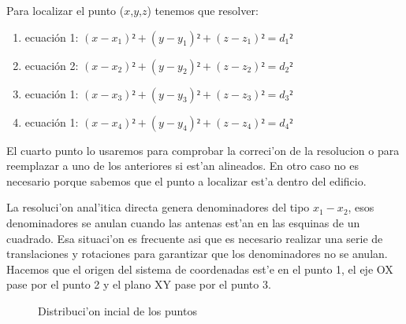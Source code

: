 Para localizar el punto ($x$,$y$,$z$) tenemos que resolver:
\begin{enumerate}
	\item ecuación 1: $(x - x_1)² + (y - y_1)² +(z - z_1)² = d_1² $
	\item ecuación 2: $(x - x_2)² + (y - y_2)² +(z - z_2)² = d_2² $
	\item ecuación 1: $(x - x_3)² + (y - y_3)² +(z - z_3)² = d_3² $
	\item ecuación 1: $(x - x_4)² + (y - y_4)² +(z - z_4)² = d_4² $
\end{enumerate}

El cuarto punto lo usaremos para comprobar la correci'on de la resolucion o para reemplazar a uno de los anteriores si est'an alineados. En otro caso no es necesario porque sabemos que el punto a localizar est'a dentro del edificio.\bigskip\newline

La resoluci'on anal'itica directa genera denominadores del tipo $x_1 - x_2$, esos denominadores se anulan cuando las antenas est'an en las esquinas de un cuadrado. Esa situaci'on es frecuente asi que es necesario realizar una serie de translaciones y rotaciones para garantizar que los denominadores no se anulan. Hacemos que el origen del sistema de coordenadas est'e en el punto 1, el eje OX pase por el punto 2 y el plano XY pase por el punto 3. \bigskip\newline

\begin{figure}[h!]
	\begin{center}
     	\end{center}
    	\caption{Distribuci'on incial de los puntos}\label{fig:triang1}
\end{figure}


